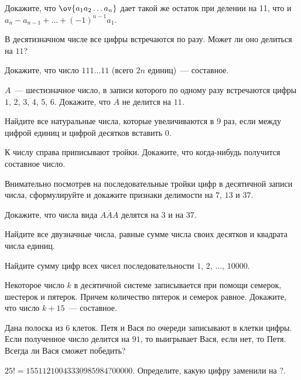 \begin{problems}
\item
Докажите, что $\ov{a_1 a_2 \ldots a_n}$ дает такой же остаток при делении на
11, что и $a_n - a_{n - 1} + \ldots + (-1)^{n - 1} a_1$.

\item
В десятизначном числе все цифры встречаются по разу.
Может ли оно делиться на $11$?

\item
Докажите, что число $111\ldots11$
(всего $2n$ единиц)~--- составное.

\item
$A$~--- шестизначное число, в записи которого по одному разу встречаются цифры
$1$, $2$, $3$, $4$, $5$, $6$.
Докажите, что $A$ не делится на $11$.

\item
Найдите все натуральные числа, которые увеличиваются в $9$ раз, если между
цифрой единиц и цифрой десятков вставить $0$.

\item
К числу справа приписывают тройки.
Докажите, что когда-нибудь получится составное число.

\item
Внимательно посмотрев на последовательные тройки цифр в десятичной записи числа,
сформулируйте и докажите признаки делимости на $7$, $13$ и $37$.

\item
Докажите, что числа вида $\overline{AAA}$ делятся на $3$ и на $37$.

\item
Найдите все двузначные числа, равные сумме числа своих десятков и квадрата
числа единиц.

\item
Найдите сумму цифр всех чисел последовательности $1$, $2$, $\ldots$, $10000$.

\item
Некоторое число $k$ в десятичной системе записывается при помощи семерок,
шестерок и пятерок.
Причем количество пятерок и семерок равное.
Докажите, что число $k + 15$~--- составное.

\item
Дана полоска из $6$ клеток.
Петя и Вася по очереди записывают в клетки цифры.
Если полученное число делится на $91$, то выигрывает Вася, если нет, то Петя.
Всегда ли Вася сможет победить?

\item
$25! = 15511210043330985984\mathbf{?}00000$.
Определите, какую цифру заменили на $\mathbf{?}$.


\end{problems}
